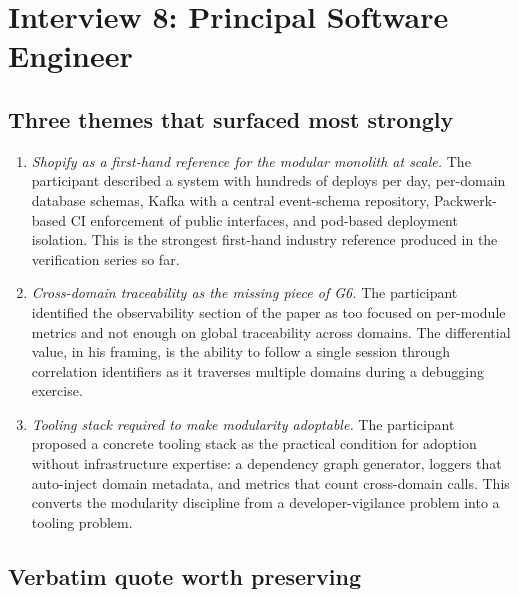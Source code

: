 
\section{Interview 8: Principal Software Engineer}
\label{sec:interview08}

\subsection*{Three themes that surfaced most strongly}

\begin{enumerate}[itemsep=3pt,topsep=2pt]
  \item \emph{Shopify as a first-hand reference for the modular monolith at scale.} The participant described a system with hundreds of deploys per day, per-domain database schemas, Kafka with a central event-schema repository, Packwerk-based CI enforcement of public interfaces, and pod-based deployment isolation. This is the strongest first-hand industry reference produced in the verification series so far.
  \item \emph{Cross-domain traceability as the missing piece of G6.} The participant identified the observability section of the paper as too focused on per-module metrics and not enough on global traceability across domains. The differential value, in his framing, is the ability to follow a single session through correlation identifiers as it traverses multiple domains during a debugging exercise.
  \item \emph{Tooling stack required to make modularity adoptable.} The participant proposed a concrete tooling stack as the practical condition for adoption without infrastructure expertise: a dependency graph generator, loggers that auto-inject domain metadata, and metrics that count cross-domain calls. This converts the modularity discipline from a developer-vigilance problem into a tooling problem.
\end{enumerate}

\subsection*{Verbatim quote worth preserving}

